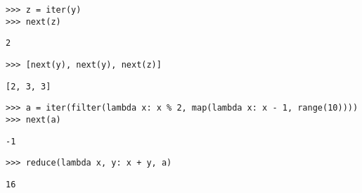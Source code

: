 \begin{blocksection}
\begin{lstlisting}
>>> z = iter(y) 
>>> next(z)
\end{lstlisting}
\begin{solution}[0.2in]
\begin{lstlisting}
2
\end{lstlisting}
\end{solution}

\begin{lstlisting}
>>> [next(y), next(y), next(z)]
\end{lstlisting}
\begin{solution}[0.2in]
\begin{lstlisting}
[2, 3, 3]
\end{lstlisting}
\end{solution}

\begin{lstlisting}
>>> a = iter(filter(lambda x: x % 2, map(lambda x: x - 1, range(10))))
>>> next(a)
\end{lstlisting}
\begin{solution}[0.2in]
\begin{lstlisting}
-1
\end{lstlisting}
\end{solution}

\begin{lstlisting}
>>> reduce(lambda x, y: x + y, a)
\end{lstlisting}
\begin{solution}[0.2in]
\begin{lstlisting}
16
\end{lstlisting}
\end{solution}

\end{blocksection}